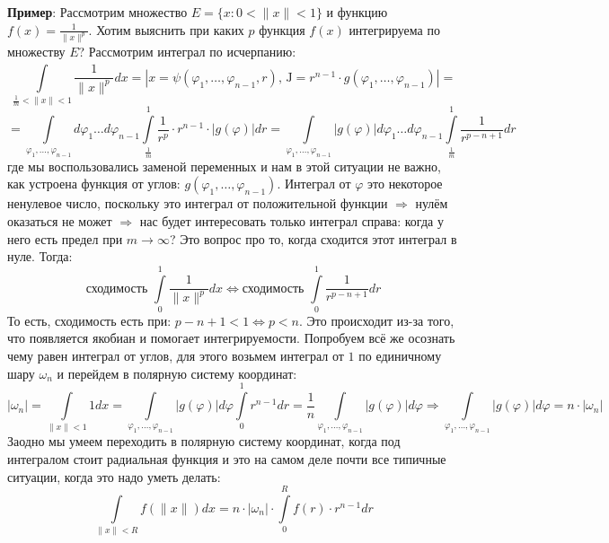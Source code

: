\documentclass[12pt]{article}
\newcommand{\MJ}{\mathrm{J}}
\theoremstyle{definition}
\newcommand{\ddint}[2]{\displaystyle\int\limits_{#1}^{#2}}
\begin{document}
\textbf{Пример}: Рассмотрим множество $E = \{x \colon 0 < \|x\| < 1\}$ и функцию $f(x) = \tfrac{1}{\|x\|^p}$. Хотим выяснить при каких $p$ функция $f(x)$ интегрируема по множеству $E$? Рассмотрим интеграл по исчерпанию:
$$
	\ddint{\tfrac{1}{m} < \|x\| < 1}{}\dfrac{1}{\|x\|^p}dx = |x = \psi(\varphi_1,\dotsc,\varphi_{n-1}, r), \, \MJ = r^{n-1}{\cdot}g(\varphi_1,\dotsc,\varphi_{n-1})| =  
$$
$$
	= \ddint{\varphi_1, \dotsc, \varphi_{n-1}}{}d\varphi_1\dotsc d\varphi_{n-1}\ddint{\tfrac{1}{m}}{1}\dfrac{1}{r^p}{\cdot}r^{n-1}{\cdot}|g(\varphi)|dr = \ddint{\varphi_1, \dotsc, \varphi_{n-1}}{}|g(\varphi)|d\varphi_1\dotsc d\varphi_{n-1}\ddint{\tfrac{1}{m}}{1}\dfrac{1}{r^{p - n + 1}}dr
$$
где мы воспользовались заменой переменных и нам в этой ситуации не важно, как устроена функция от углов: $g(\varphi_1,\dotsc,\varphi_{n-1})$. Интеграл от $\varphi$ это некоторое ненулевое число, поскольку это интеграл от положительной функции $\Rightarrow$ нулём оказаться не может $\Rightarrow$ нас будет интересовать только интеграл справа: когда у него есть предел при $m \to \infty$? Это вопрос про то, когда сходится этот интеграл в нуле. Тогда:
$$
	\text{сходимость } \ddint{0}{1}\dfrac{1}{\|x\|^p}dx \Leftrightarrow \text{сходимость } \ddint{0}{1}\dfrac{1}{r^{p - n + 1}}dr
$$
То есть, сходимость есть при: $p - n + 1 < 1 \Leftrightarrow p < n$. Это происходит из-за того, что появляется якобиан и помогает интегрируемости. Попробуем всё же осознать чему равен интеграл от углов, для этого возьмем интеграл от $1$ по единичному шару $\omega_n$ и перейдем в полярную систему координат:
$$
	|\omega_n| = \ddint{\|x\| < 1}{}1dx = \ddint{\varphi_1,\dotsc, \varphi_{n-1}}{}|g(\varphi)|d\varphi\ddint{0}{1}r^{n-1}dr = \dfrac{1}{n}\ddint{\varphi_1,\dotsc, \varphi_{n-1}}{}|g(\varphi)|d\varphi \Rightarrow \ddint{\varphi_1,\dotsc, \varphi_{n-1}}{}|g(\varphi)|d\varphi = n{\cdot}|\omega_n|
$$
Заодно мы умеем переходить в полярную систему координат, когда под интегралом стоит радиальная функция и это на самом деле почти все типичные ситуации, когда это надо уметь делать:
$$
	\ddint{\|x\| < R}{} f(\|x\|)dx = n{\cdot}|\omega_n|{\cdot}\ddint{0}{R}f(r){\cdot}r^{n-1}dr
$$
\end{document}
